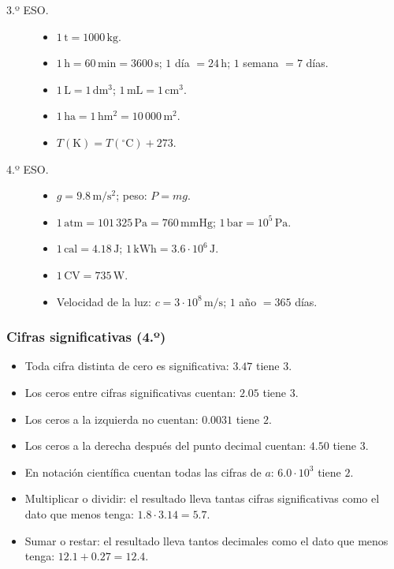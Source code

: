 \begin{description}
    \item[3.º ESO.]
    \begin{itemize}
        \item $1\,\mathrm{t}=1000\,\mathrm{kg}$.
        \item $1\,\mathrm{h}=60\,\mathrm{min}=3600\,\mathrm{s}$;
        $1$ día $=24\,\mathrm{h}$;
        $1$ semana $=7$ días.
        \item $1\,\mathrm{L}=1\,\mathrm{dm^3}$;
        $1\,\mathrm{mL}=1\,\mathrm{cm^3}$.
        \item $1\,\mathrm{ha}=1\,\mathrm{hm^2}=10\,000\,\mathrm{m^2}$.
        \item $T(\mathrm{K})=T({}^\circ\mathrm{C})+273$.
    \end{itemize}

    \item[4.º ESO.]
    \begin{itemize}
        \item $g=9.8\,\mathrm{m/s^2}$; peso: $P=mg$.
        \item $1\,\mathrm{atm}=101\,325\,\mathrm{Pa}=760\,\mathrm{mmHg}$;
        $1\,\mathrm{bar}=10^5\,\mathrm{Pa}$.
        \item $1\,\mathrm{cal}=4.18\,\mathrm{J}$;
        $1\,\mathrm{kWh}=3.6\cdot10^6\,\mathrm{J}$.
        \item $1\,\mathrm{CV}=735\,\mathrm{W}$.
        \item Velocidad de la luz:
        $c=3\cdot10^8\,\mathrm{m/s}$;
        $1$ año $=365$ días.
    \end{itemize}
\end{description}

\subsubsection*{Cifras significativas (4.º)}

\begin{itemize}
    \item Toda cifra distinta de cero es significativa:
    $3.47$ tiene $3$.
    \item Los ceros entre cifras significativas cuentan:
    $2.05$ tiene $3$.
    \item Los ceros a la izquierda no cuentan:
    $0.0031$ tiene $2$.
    \item Los ceros a la derecha después del punto decimal cuentan:
    $4.50$ tiene $3$.
    \item En notación científica cuentan todas las cifras de $a$:
    $6.0\cdot10^3$ tiene $2$.
    \item Multiplicar o dividir: el resultado lleva tantas cifras
    significativas como el dato que menos tenga:
    $1.8\cdot3.14=5.7$.
    \item Sumar o restar: el resultado lleva tantos decimales
    como el dato que menos tenga:
    $12.1+0.27=12.4$.
\end{itemize}

